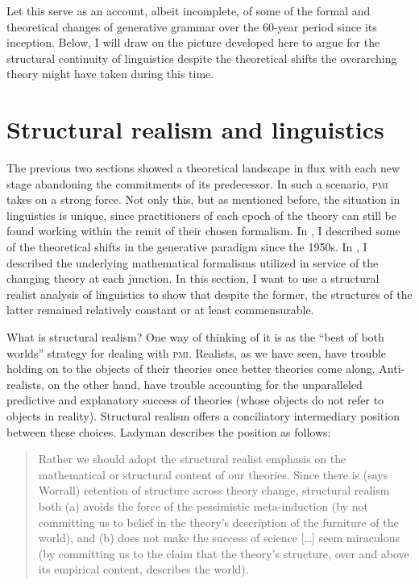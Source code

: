 \documentclass[output=paper]{langscibook}
\begin{document}
Let this serve as an account, albeit incomplete, of some of the formal and theoretical changes of generative grammar over the 60-year period since its inception. Below, I will draw on the picture developed here to argue for the structural continuity of linguistics despite the theoretical shifts the overarching theory might have taken during this time.

\section{Structural realism and linguistics}
\label{sec:nefdt:structuralrealism}

The previous two sections showed a theoretical landscape in flux with each new stage abandoning the commitments of its predecessor. In such a scenario, \textsc{pmi} takes on a strong force. Not only this, but as mentioned before, the situation in linguistics is unique, since practitioners of each epoch of the theory can still be found working within the remit of their chosen formalism. In , I described some of the theoretical shifts in the generative paradigm since the 1950s. In , I described the underlying mathematical formalisms utilized in service of the changing theory at each junction. In this section, I want to use a structural realist analysis of linguistics to show that despite the former, the structures of the latter remained relatively constant or at least commensurable. 

What is structural realism? One way of thinking of it is as the ``best of both worlds'' strategy for dealing with \textsc{pmi}. Realists, as we have seen, have trouble holding on to the objects of their theories once better theories come along. Anti-realists, on the other hand, have trouble accounting for the unparalleled predictive and explanatory success of theories (whose objects do not refer to objects in reality). Structural realism offers a conciliatory intermediary position between these choices. Ladyman describes the position as follows:

\begin{quote}
Rather we should adopt the structural realist emphasis on the mathematical or structural content of our theories. Since there is (says Worrall) retention of structure across theory change, structural realism both (a) avoids the force of the pessimistic meta-induction (by not committing us to belief in the theory's description of the furniture of the world), and (b) does not make the success of science […] seem miraculous (by committing us to the claim that the theory's structure, over and above its empirical content, describes the world). \citep[410]{Ladyman1998}
\end{quote}
\end{document}

